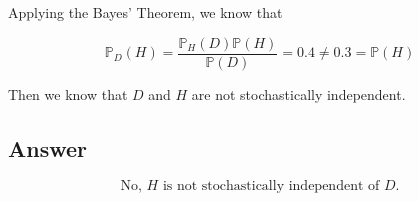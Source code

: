 \documentclass[12pt]{article}
\newcommand{\bP}{\mathbb{P}}
\begin{document}
\begin{enumerate}[start=1,label={\bfseries Part \arabic*:},leftmargin=0in]
			Applying the Bayes’ Theorem, we know that
			
			\[\bP_D(H) = \frac{\bP_H(D)\bP(H)}{\bP(D)} = 0.4 \ne 0.3 = \bP(H)\]
			
			Then we know that $D$ and $H$ are not stochastically independent.
		
		\subsection*{Answer}
		
			\[\boxed{\text{No, $H$ is not stochastically independent of $D$.}}\]
	\end{enumerate}
	
\end{document}
